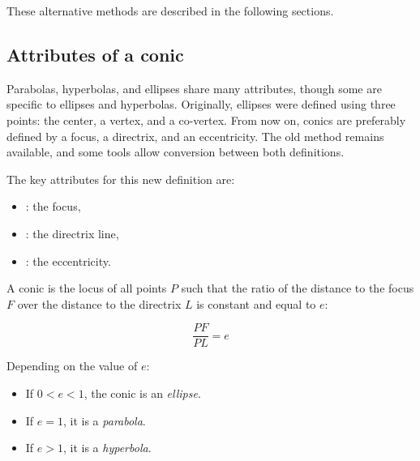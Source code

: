 These alternative methods are described in the following sections.



\subsection{Attributes of a conic}

Parabolas, hyperbolas, and ellipses share many attributes, though some are specific to ellipses and hyperbolas. Originally, ellipses were defined using three points: the center, a vertex, and a co-vertex. From now on, conics are preferably defined by a focus, a directrix, and an eccentricity. The old method remains available, and some tools allow conversion between both definitions.

\vspace{1em}

The key attributes for this new definition are:
\begin{itemize}
  \item {} : the focus,
  \item {} : the directrix line,
  \item {} : the eccentricity.
\end{itemize}

\vspace{1em}

A conic is the locus of all points $P$ such that the ratio of the distance to the focus $F$ over the distance to the directrix $L$ is constant and equal to $e$:

\[
\frac{PF}{PL} = e
\]

Depending on the value of $e$:
\begin{itemize}
  \item If $0 < e < 1$, the conic is an \emph{ellipse}.
  \item If $e = 1$, it is a \emph{parabola}.
  \item If $e > 1$, it is a \emph{hyperbola}.
\end{itemize}

